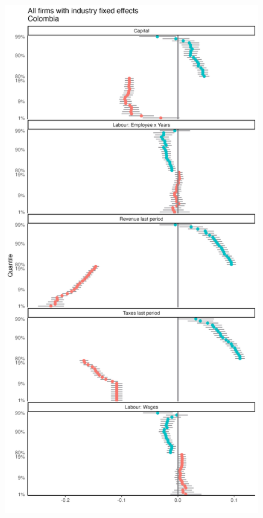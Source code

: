 \documentclass[
  12pt]{article}
\theoremstyle{definition}
\theoremstyle{remark}
\begin{document}
\begin{figure}

{\centering \includegraphics[width=\textwidth,height=1\textheight]{../Results/Figures/Colombia/beta_diff_all_fe.png}

}

\end{figure}
\end{document}
